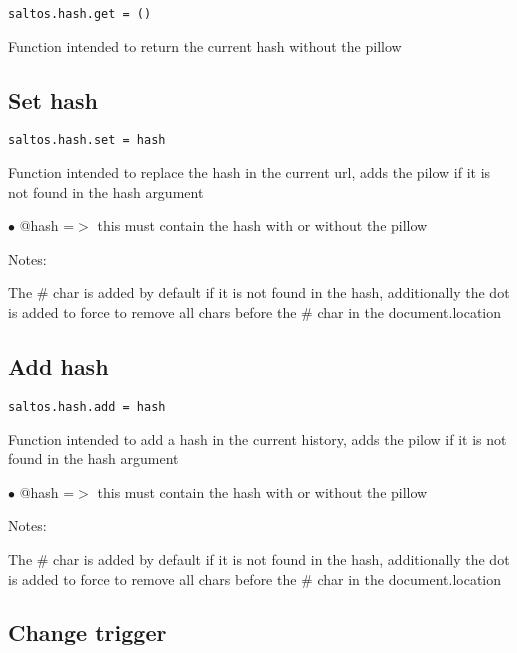 \documentclass[a4paper]{book}
\begin{document}
\begin{lstlisting}
saltos.hash.get = ()
\end{lstlisting}

Function intended to return the current hash without the pillow

\hypertarget{toc429}{}
\subsection{Set hash}

\begin{lstlisting}
saltos.hash.set = hash
\end{lstlisting}

Function intended to replace the hash in the current url, adds the pilow if it is not found
in the hash argument

\begin{compactitem}
\item[\color{myblue}$\bullet$] @hash =$>$ this must contain the hash with or without the pillow
\end{compactitem}

Notes:

The \# char is added by default if it is not found in the hash, additionally the dot is
added to force to remove all chars before the \# char in the document.location

\hypertarget{toc430}{}
\subsection{Add hash}

\begin{lstlisting}
saltos.hash.add = hash
\end{lstlisting}

Function intended to add a hash in the current history, adds the pilow if it is not found
in the hash argument

\begin{compactitem}
\item[\color{myblue}$\bullet$] @hash =$>$ this must contain the hash with or without the pillow
\end{compactitem}

Notes:

The \# char is added by default if it is not found in the hash, additionally the dot is
added to force to remove all chars before the \# char in the document.location

\hypertarget{toc431}{}
\subsection{Change trigger}
\end{document}
